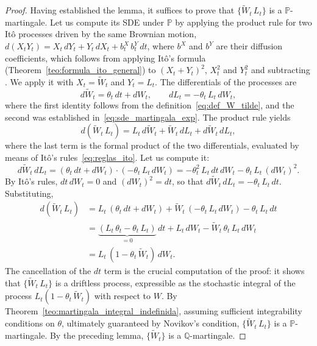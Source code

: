 \documentclass[11pt,a4paper,oneside]{report}
\theoremstyle{plain}
\theoremstyle{definition}
\theoremstyle{remark}
\newcommand{\PP}{\mathbb{P}}
\newcommand{\Q}{\mathbb{Q}}
\newcommand{\1}{\mathbf{1}}
\begin{document}
\begin{proof}
Having established the lemma, it suffices to prove that
$\{\widetilde{W}_t\, L_t\}$ is a $\PP$-martingale. Let us compute its
SDE under $\PP$ by applying the product rule for two Itô processes
driven by the same Brownian motion,
$d(X_t Y_t) = X_t\, dY_t + Y_t\, dX_t + b^X_t\, b^Y_t\, dt$, where $b^X$ and
$b^Y$ are their diffusion coefficients, which follows from applying Itô's
formula (Theorem~\ref{teo:formula_ito_general}) to $(X_t + Y_t)^2$, $X_t^2$
and $Y_t^2$ and subtracting \cite[Theorem~4.4.2]{etheridge}. We apply it
with $X_t = \widetilde{W}_t$ and $Y_t = L_t$. The
differentials of the processes are
\begin{equation*}
  d\widetilde{W}_t = \theta_t\, dt + dW_t, \qquad
  dL_t = -\theta_t\, L_t\, dW_t,
\end{equation*}
where the first identity follows from the
definition~\eqref{eq:def_W_tilde}, and the second was established
in~\eqref{eq:sde_martingala_exp}. The product rule yields
\begin{equation*}
  d(\widetilde{W}_t\, L_t)
  = L_t\, d\widetilde{W}_t + \widetilde{W}_t\, dL_t
   + d\widetilde{W}_t\, dL_t,
\end{equation*}
where the last term is the formal product of the two differentials,
evaluated by means of Itô's rules~\eqref{eq:reglas_ito}. Let us
compute it:
\begin{equation*}
  d\widetilde{W}_t\, dL_t
  = (\theta_t\, dt + dW_t) \cdot (-\theta_t\, L_t\, dW_t)
  = -\theta_t^2\, L_t\, dt\, dW_t - \theta_t\, L_t\, (dW_t)^2.
\end{equation*}
By Itô's rules, $dt\, dW_t = 0$ and $(dW_t)^2 = dt$, so that
$d\widetilde{W}_t\, dL_t = -\theta_t\, L_t\, dt$. Substituting,
\begin{align*}
  d(\widetilde{W}_t\, L_t)
  &= L_t\,(\theta_t\, dt + dW_t)
   + \widetilde{W}_t\, (-\theta_t\, L_t\, dW_t)
   - \theta_t\, L_t\, dt \\
  &= \underbrace{(L_t\, \theta_t - \theta_t\, L_t)}_{= 0}\, dt
   + L_t\, dW_t - \widetilde{W}_t\, \theta_t\, L_t\, dW_t \\
  &= L_t\, (1 - \theta_t\, \widetilde{W}_t)\, dW_t.
\end{align*}
The cancellation of the $dt$ term is the crucial computation of the
proof: it shows that $\{\widetilde{W}_t\, L_t\}$ is a driftless
process, expressible as the stochastic integral of the process
$L_t (1 - \theta_t\, \widetilde{W}_t)$ with respect to $W$. By
Theorem~\ref{teo:martingala_integral_indefinida}, assuming sufficient
integrability conditions on $\theta$, ultimately guaranteed by
Novikov's condition, $\{\widetilde{W}_t\, L_t\}$ is a
$\PP$-martingale. By the preceding lemma, $\{\widetilde{W}_t\}$ is a
$\Q$-martingale.


\end{proof}
\end{document}
